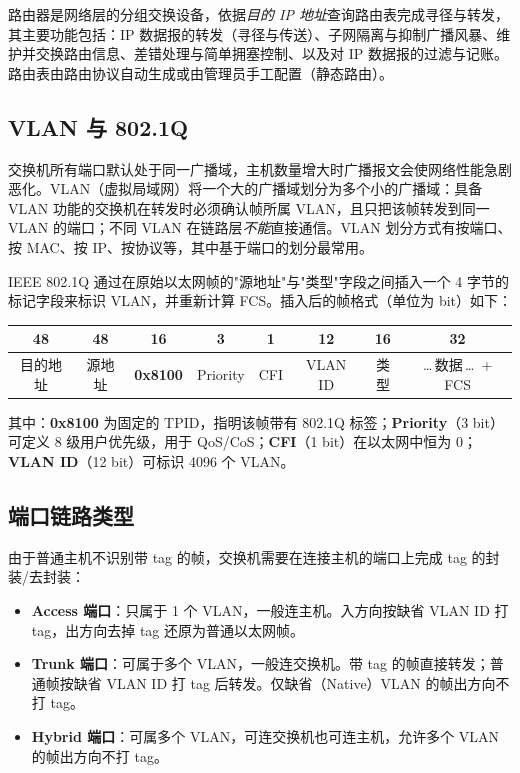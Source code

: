 \documentclass[12pt,a4paper]{article}
\begin{document}
路由器是网络层的分组交换设备，依据\emph{目的 IP 地址}查询路由表完成寻径与转发，其主要功能包括：IP 数据报的转发（寻径与传送）、子网隔离与抑制广播风暴、维护并交换路由信息、差错处理与简单拥塞控制、以及对 IP 数据报的过滤与记账。路由表由路由协议自动生成或由管理员手工配置（静态路由）。

\subsection{VLAN 与 802.1Q}
交换机所有端口默认处于同一广播域，主机数量增大时广播报文会使网络性能急剧恶化。VLAN（虚拟局域网）将一个大的广播域划分为多个小的广播域：具备 VLAN 功能的交换机在转发时必须确认帧所属 VLAN，且只把该帧转发到同一 VLAN 的端口；不同 VLAN 在链路层\emph{不能}直接通信。VLAN 划分方式有按端口、按 MAC、按 IP、按协议等，其中基于端口的划分最常用。

IEEE 802.1Q 通过在原始以太网帧的"源地址"与"类型"字段之间插入一个 4 字节的标记字段来标识 VLAN，并重新计算 FCS。插入后的帧格式（单位为 bit）如下：

\begin{center}
\begin{tabular}{cccccccc}
\toprule
48 & 48 & 16 & 3 & 1 & 12 & 16 & 32 \\
\midrule
目的地址 & 源地址 & \textbf{0x8100} & Priority & CFI & VLAN ID & 类型 & \dots\,数据\,\dots\ + FCS \\
\bottomrule
\end{tabular}
\end{center}

其中：\textbf{0x8100} 为固定的 TPID，指明该帧带有 802.1Q 标签；\textbf{Priority}（3 bit）可定义 8 级用户优先级，用于 QoS/CoS；\textbf{CFI}（1 bit）在以太网中恒为 0；\textbf{VLAN ID}（12 bit）可标识 4096 个 VLAN。

\subsection{端口链路类型}
由于普通主机不识别带 tag 的帧，交换机需要在连接主机的端口上完成 tag 的封装/去封装：
\begin{itemize}
  \item \textbf{Access 端口}：只属于 1 个 VLAN，一般连主机。入方向按缺省 VLAN ID 打 tag，出方向去掉 tag 还原为普通以太网帧。
  \item \textbf{Trunk 端口}：可属于多个 VLAN，一般连交换机。带 tag 的帧直接转发；普通帧按缺省 VLAN ID 打 tag 后转发。仅缺省（Native）VLAN 的帧出方向不打 tag。
  \item \textbf{Hybrid 端口}：可属多个 VLAN，可连交换机也可连主机，允许多个 VLAN 的帧出方向不打 tag。
\end{itemize}
\end{document}
